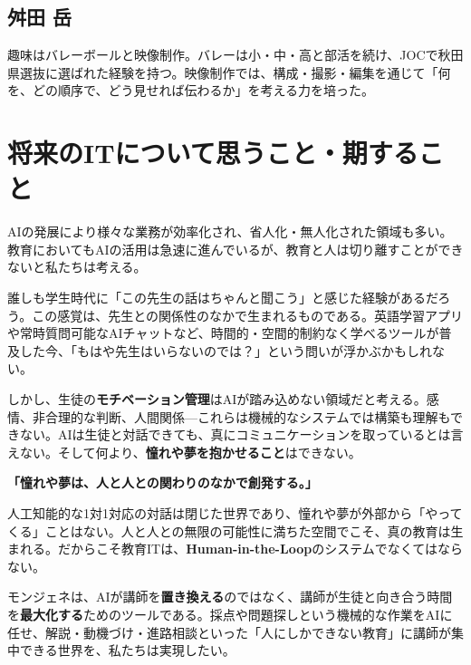 \documentclass[paper=a4,fontsize=10.5bp,jafontsize=10.5bp]{jlreq}
\begin{document}
\subsection*{舛田 岳}
趣味はバレーボールと映像制作。バレーは小・中・高と部活を続け、JOCで秋田県選抜に選ばれた経験を持つ。映像制作では、構成・撮影・編集を通じて「何を、どの順序で、どう見せれば伝わるか」を考える力を培った。

\section{将来のITについて思うこと・期すること}

AIの発展により様々な業務が効率化され、省人化・無人化された領域も多い。教育においてもAIの活用は急速に進んでいるが、教育と人は切り離すことができないと私たちは考える。

誰しも学生時代に「この先生の話はちゃんと聞こう」と感じた経験があるだろう。この感覚は、先生との関係性のなかで生まれるものである。英語学習アプリや常時質問可能なAIチャットなど、時間的・空間的制約なく学べるツールが普及した今、「もはや先生はいらないのでは？」という問いが浮かぶかもしれない。

しかし、生徒の\textbf{モチベーション管理}はAIが踏み込めない領域だと考える。感情、非合理的な判断、人間関係---これらは機械的なシステムでは構築も理解もできない。AIは生徒と対話できても、真にコミュニケーションを取っているとは言えない。そして何より、\textbf{憧れや夢を抱かせること}はできない。

\begin{highlightbox}
\textbf{「憧れや夢は、人と人との関わりのなかで創発する。」}

人工知能的な1対1対応の対話は閉じた世界であり、憧れや夢が外部から「やってくる」ことはない。人と人との無限の可能性に満ちた空間でこそ、真の教育は生まれる。だからこそ教育ITは、\textbf{Human-in-the-Loop}のシステムでなくてはならない。
\end{highlightbox}

モンジェネは、AIが講師を\textbf{置き換える}のではなく、講師が生徒と向き合う時間を\textbf{最大化する}ためのツールである。採点や問題探しという機械的な作業をAIに任せ、解説・動機づけ・進路相談といった「人にしかできない教育」に講師が集中できる世界を、私たちは実現したい。
\end{document}
